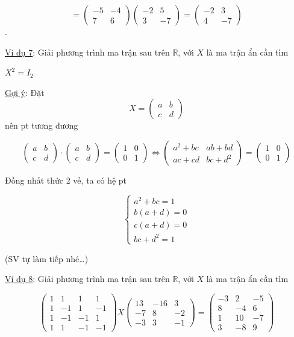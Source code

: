 \documentclass[
]{article}
\let\ul\uline
\begin{document}
$$ = \begin{pmatrix} -5 & -4 \\ 7 & 6 \end{pmatrix} \begin{pmatrix} -2 & 5 \\ 3 & -7 \end{pmatrix} = \begin{pmatrix} -2 & 3 \\ 4 & -7 \end{pmatrix} $$.

\ul{Ví dụ 7}: Giải phương trình ma trận sau trên
$\mathbb{R}$, với
$X$ là ma trận ẩn
cần tìm

$X^2 = I_2$

\ul{Gợi ý}: Đặt
$$X = \begin{pmatrix} a & b \\ c & d \end{pmatrix}$$ nên pt tương
đương

$$\begin{pmatrix} a & b \\ c & d \end{pmatrix} \cdot \begin{pmatrix} a & b \\ c & d \end{pmatrix} = \begin{pmatrix} 1 & 0 \\ 0 & 1 \end{pmatrix} \Leftrightarrow \begin{pmatrix} a^2 + bc & ab + bd \\ ac + cd & bc + d^2 \end{pmatrix} = \begin{pmatrix} 1 & 0 \\ 0 & 1 \end{pmatrix}$$

Đồng nhất thức 2 vế, ta có hệ pt

$$\begin{cases} a^2 + bc = 1 \\ b(a + d) = 0 \\ c(a + d) = 0 \\ bc + d^2 = 1 \end{cases}$$

(SV tự làm tiếp nhé\ldots)

\ul{Ví dụ 8}: Giải phương trình ma trận sau trên
$\mathbb{R}$, với
$X$ là ma trận ẩn
cần tìm

$$\begin{pmatrix} 1 & 1 & 1 & 1 \\ 1 & -1 & 1 & -1 \\ 1 & -1 & -1 & 1 \\ 1 & 1 & -1 & -1 \end{pmatrix} X \begin{pmatrix} 13 & -16 & 3 \\ -7 & 8 & -2 \\ -3 & 3 & -1 \end{pmatrix} = \begin{pmatrix} -3 & 2 & -5 \\ 8 & -4 & 6 \\ 1 & 10 & -7 \\ 3 & -8 & 9 \end{pmatrix}$$
\end{document}
